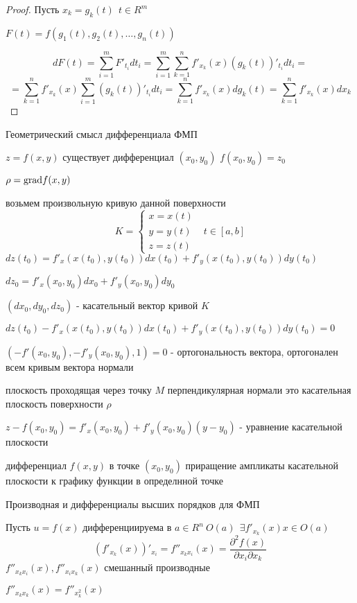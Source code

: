 \begin{proof}
  Пусть $x_k = g_k(t) ~~ t \in R^m$

  $F(t) = f(g_1(t), g_2(t), \ldots, g_n(t))$

  $$
  dF(t) = \sum_{i=1}^m F'_{t_i}dt_i = \sum_{i=1}^m \sum_{k=1}^n
  f'_{x_k}(x) (g_k(t))'_{t_i}dt_i =
  $$
  $$
  = \sum_{k=1}^n f'_{x_k}(x) \sum_{i=1}^m (g_k(t))'_{t_i} dt_i =
  \sum_{k=1}^n f'_{x_k}(x)dg_k(t) = \sum_{k=1}^n f'_{x_k}(x) dx_k
  $$
\end{proof}

\begin{title}[\Large]
  Геометрический смысл дифференциала ФМП
\end{title}
$z = f(x, y)$ существует дифференциал $(x_0, y_0)$ $f(x_0, y_0) = z_0$

$\rho = \mathrm{grad} f(x, y)$

возьмем произвольную кривую данной поверхности
$$
K = \left\{
\begin{array}{l}
  x = x(t) \\
  y = y(t) \\
  z = z(t)
\end{array}
\right. ~~~ t \in [a,b]
$$
$dz(t_0) = f'_x(x(t_0), y(t_0)) dx(t_0) + f'_y(x(t_0), y(t_0))dy(t_0)$

$dz_0 = f'_x (x_0, y_0)dx_0 + f'_y(x_0, y_0)dy_0$

$(dx_0, dy_0, dz_0)$ - касательный вектор кривой $K$

$dz(t_0) - f'_x(x(t_0), y(t_0)) dx(t_0) + f'_y(x(t_0), y(t_0))dy(t_0) = 0$

$(-f'(x_0, y_0), -f'_y(x_0, y_0), 1) = 0$ - ортогональность вектора,
ортогонален всем кривым вектора нормали

плоскость проходящая через точку $M$ перпендикулярная нормали это касательная
плоскость поверхности $\rho$

$z - f(x_0, y_0) = f'_x(x_0, y_0) + f'_y(x_0, y_0)(y - y_0)$ - уравнение
касательной плоскости

дифференциал $f(x,y)$ в точке $(x_0, y_0)$ приращение ампликаты касательной
плоскости к графику функции в определнной точке

\begin{title}[\Large]
  Производная и дифференциалы высших порядков для ФМП
\end{title}

\begin{define}
  Пусть $u = f(x)$ дифференциируема в $a \in R^n ~ O(a) ~~ \exists f'_{x_k}(x)
  x \in O(a)$
  $$
  (f'_{x_k}(x))'_{x_i} = f''_{x_k x_i}(x) = \frac{\partial^2 f(x)}
  {\partial x_i \partial x_k}
  $$
  $f''_{x_k x_i}(x), f''_{x_i x_k}(x)$ смешанный производные

  $f''_{x_k x_k}(x) = f''_{x_k^2}(x)$
\end{define}

